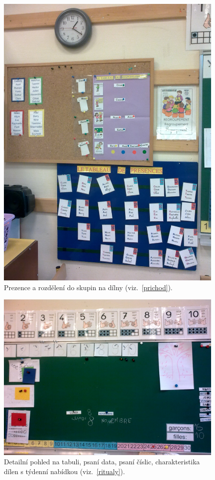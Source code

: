 	\begin{figure}[tb]
		\centering
		\includegraphics[height=0.35\textheight]{./fotky/Obr10.jpg}
		\caption{
			Prezence a rozdělení do skupin na dílny (viz.~\ref{prichod}).
		}
		\label{Obr10}
	\end{figure}

	\begin{figure}[tb]
		\centering
		\includegraphics[height=0.35\textheight]{./fotky/Obr11.jpg}
		\caption{
			Detailní pohled na tabuli, psaní data, psaní číslic, charakteristika dílen s týdenní nabídkou  (viz.~\ref{ritualy}).
		}
		\label{Obr11}
	\end{figure}


